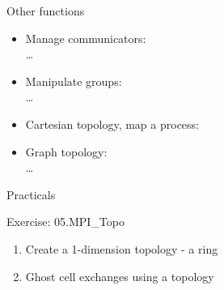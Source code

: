 \documentclass[aspectratio=43]{beamer}
\begin{document}
\begin{frame}[fragile]{Other functions}
\begin{itemize}
    \item Manage communicators:\\\hspace{1cm} \ldots
    \item Manipulate groups:\\\hspace{1cm} \ldots
        \item Cartesian topology, map a process:\\\hspace{1cm}
        \item Graph topology:\\\hspace{1cm} \ldots
\end{itemize}
\end{frame}


\begin{frame}{Practicals}
    \begin{brown2block}{Exercise: 05.MPI\_Topo}
    \begin{enumerate}
        \item Create a 1-dimension topology - a ring
        \item Ghost cell exchanges using a topology
    \end{enumerate}
    \end{brown2block}
\end{frame}




\end{document}
